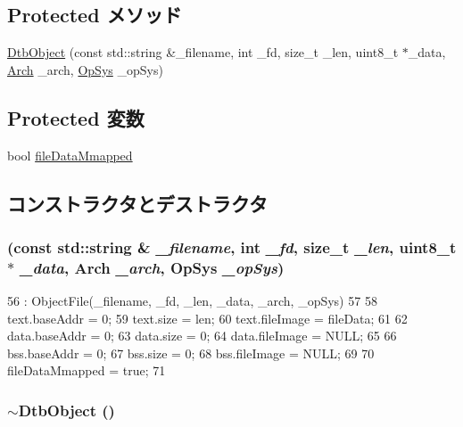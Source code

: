 \subsection*{Protected メソッド}
\begin{DoxyCompactItemize}
\item 
\hyperlink{classDtbObject_ab48ec9e732244daaaa0dee06ea827de6}{DtbObject} (const std::string \&\_\-filename, int \_\-fd, size\_\-t \_\-len, uint8\_\-t $\ast$\_\-data, \hyperlink{classObjectFile_a0ac03ab06a859320a9072002bdf3aa0f}{Arch} \_\-arch, \hyperlink{classObjectFile_aafc438343baf22e5884dde40c41331e8}{OpSys} \_\-opSys)
\end{DoxyCompactItemize}
\subsection*{Protected 変数}
\begin{DoxyCompactItemize}
\item 
bool \hyperlink{classDtbObject_a7fb4f2b3db8f5603574f0e9cc114c360}{fileDataMmapped}
\end{DoxyCompactItemize}


\subsection{コンストラクタとデストラクタ}
\hypertarget{classDtbObject_ab48ec9e732244daaaa0dee06ea827de6}{
\subsubsection[{DtbObject}]{ (const std::string \& {\em \_\-filename}, \/  int {\em \_\-fd}, \/  size\_\-t {\em \_\-len}, \/  uint8\_\-t $\ast$ {\em \_\-data}, \/  {\bf Arch} {\em \_\-arch}, \/  {\bf OpSys} {\em \_\-opSys})}}
\label{classDtbObject_ab48ec9e732244daaaa0dee06ea827de6}



\begin{DoxyCode}
56     : ObjectFile(_filename, _fd, _len, _data, _arch, _opSys)
57 {
58     text.baseAddr = 0;
59     text.size = len;
60     text.fileImage = fileData;
61 
62     data.baseAddr = 0;
63     data.size = 0;
64     data.fileImage = NULL;
65 
66     bss.baseAddr = 0;
67     bss.size = 0;
68     bss.fileImage = NULL;
69 
70     fileDataMmapped = true;
71 }
\end{DoxyCode}
\hypertarget{classDtbObject_a46a1bb2e6ec09d7b37530e94b2529452}{
\subsubsection[{$\sim$DtbObject}]{\setlength{\rightskip}{0pt plus 5cm}$\sim${\bf DtbObject} ()}}
\label{classDtbObject_a46a1bb2e6ec09d7b37530e94b2529452}



